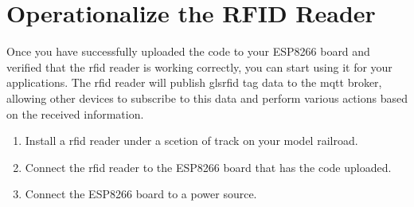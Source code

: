 \section{Operationalize the RFID Reader}
Once you have successfully uploaded the code to your ESP8266 board and verified that the \gls{rfid} reader is working correctly, you can start using it for your applications.
The \gls{rfid} reader will publish gls{rfid} tag data to the \gls{mqtt} broker, allowing other devices to subscribe to this data and perform various actions based on the received information.
\begin{enumerate}
    \item Install a \gls{rfid} reader under a scetion of track on your model railroad.
    \item Connect the \gls{rfid} reader to the ESP8266 board that has the code uploaded.
    \item Connect the ESP8266 board to a power source.
\end{enumerate}

